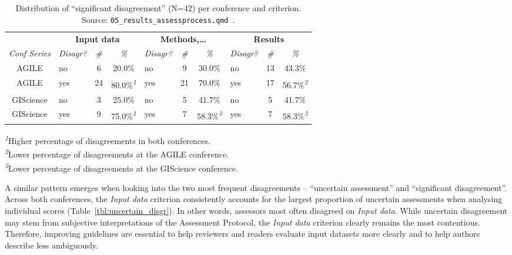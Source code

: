 \documentclass{josis}
\begin{document}
\begin{table}
\centering
\begin{tabular*}{\linewidth}{@{\extracolsep{\fill}}clcclcclcc}
\toprule
 & \multicolumn{3}{c}{\textbf{Input data}} & \multicolumn{3}{c}{\textbf{Methods,\ldots{}}} & \multicolumn{3}{c}{\textbf{Results}} \\ 
\cmidrule(lr){2-4} \cmidrule(lr){5-7} \cmidrule(lr){8-10}
\emph{Conf Series} & \emph{Disagr?} & \emph{\#} & \emph{\%} & \emph{Disagr?} & \emph{\#} & \emph{\%} & \emph{Disagr?} & \emph{\#} & \emph{\%} \\ 
\midrule\addlinespace[2.5pt]
AGILE & no & 6 & 20.0\% & no & 9 & 30.0\% & no & 13 & 43.3\% \\ 
{AGILE} & {yes} & {24} & {80.0\%}\textsuperscript{\textit{1}} & {yes} & {21} & {70.0\%} & {yes} & {17} & {56.7\%}\textsuperscript{\textit{2}} \\ 
GIScience & no & 3 & 25.0\% & no & 5 & 41.7\% & no & 5 & 41.7\% \\ 
GIScience & yes & 9 & 75.0\%\textsuperscript{\textit{1}} & yes & 7 & 58.3\%\textsuperscript{\textit{3}} & yes & 7 & 58.3\%\textsuperscript{\textit{3}} \\ 
\bottomrule
\end{tabular*}
\begin{minipage}{\linewidth}
\textsuperscript{\textit{1}}Higher percentage of disagreements in both conferences.\\
\textsuperscript{\textit{2}}Lower percentage of disagreements at the AGILE conference.\\
\textsuperscript{\textit{3}}Lower percentage of disagreements at the GIScience conference.\\
\end{minipage}
\caption{Distribution of ``significant disagreement'' (N=42) per conference and criterion. Source: \texttt{05\_results\_assessprocess.qmd}~\cite{data}.}\label{tbl:significant_disgr}
\end{table}

A similar pattern emerges when looking into the two most frequent disagreements -- ``uncertain assessment'' and ``significant disagreement''. Across both conferences, the \textit{Input data} criterion consistently accounts for the largest proportion of uncertain assessments when analysing individual scores (Table~\ref{tbl:uncertain_disgr}). In other words, assessors most often disagreed on \textit{Input data}. While uncertain disagreement may stem from subjective interpretations of the Assessment Protocol, the \textit{Input data} criterion clearly remains the most contentious. Therefore, improving guidelines are essential to help reviewers and readers evaluate input datasets more clearly and to help authors describe less ambiguously.
\end{document}
